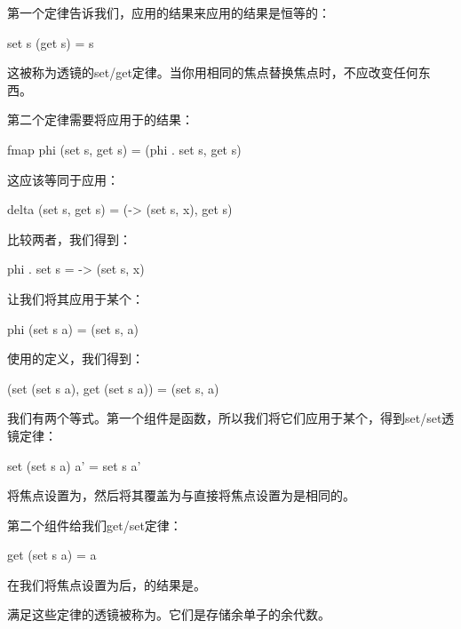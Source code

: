 \documentclass[DaoFP]{subfiles}
\begin{document}
第一个定律告诉我们，应用的结果来应用的结果是恒等的：
\begin{haskell}
set s (get  s) = s
\end{haskell}
这被称为透镜的set/get定律。当你用相同的焦点替换焦点时，不应改变任何东西。

第二个定律需要将应用于的结果：
\begin{haskell}
fmap phi (set s, get s) = (phi . set s, get s)
\end{haskell}
这应该等同于应用：
\begin{haskell}
delta (set s, get s) = (\x -> (set s, x), get s)
\end{haskell}
比较两者，我们得到：
\begin{haskell}
phi . set s = \x -> (set s, x)
\end{haskell}
让我们将其应用于某个：
\begin{haskell}
phi (set s a) = (set s, a)
\end{haskell}
使用的定义，我们得到：
\begin{haskell}
(set (set s a), get (set s a)) = (set s, a)
\end{haskell}
我们有两个等式。第一个组件是函数，所以我们将它们应用于某个，得到set/set透镜定律：
\begin{haskell}
set (set s a) a' = set s a'
\end{haskell}
将焦点设置为，然后将其覆盖为与直接将焦点设置为是相同的。

第二个组件给我们get/set定律：
\begin{haskell}
get (set s a) = a
\end{haskell}
在我们将焦点设置为后，的结果是。

满足这些定律的透镜被称为。它们是存储余单子的余代数。
\end{document}

